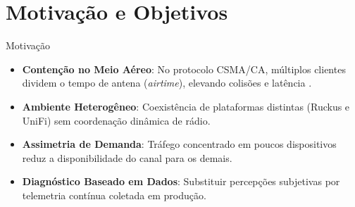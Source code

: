 \documentclass[10pt,brazil]{beamer}
\begin{document}
    \section{Motivação e Objetivos}
    \begin{frame}{Motivação}
        \begin{itemize}
            \item \textbf{Contenção no Meio Aéreo}: No protocolo CSMA/CA, múltiplos clientes dividem o tempo de antena (\textit{airtime}), elevando colisões e latência \cite{gast2005}.
            \item \textbf{Ambiente Heterogêneo}: Coexistência de plataformas distintas (Ruckus e UniFi) sem coordenação dinâmica de rádio.
            \item \textbf{Assimetria de Demanda}: Tráfego concentrado em poucos dispositivos reduz a disponibilidade do canal para os demais.
            \item \textbf{Diagnóstico Baseado em Dados}: Substituir percepções subjetivas por telemetria contínua coletada em produção.
        \end{itemize}
    \end{frame}
    
\end{document}
